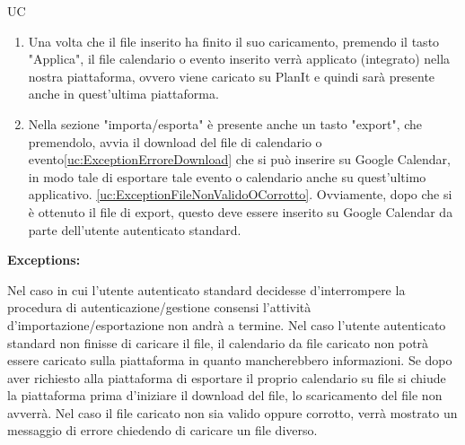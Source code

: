 \begin{listaPersonale}{UC}
\begin{listaPersonale2}[UC] {}
\begin{listaPersonale3}[UC]{}
\begin{enumerate}
                \item Una volta che il file inserito ha finito il suo caricamento, premendo il tasto "Applica", il file calendario o evento inserito verrà applicato (integrato) nella nostra piattaforma, ovvero viene caricato su PlanIt e quindi sarà presente anche in quest'ultima piattaforma.
                \item Nella sezione "importa/esporta" è presente anche un tasto "export", che premendolo, avvia il download del file di calendario o evento\ref{uc:ExceptionErroreDownload} che si può inserire su Google Calendar, in modo tale di esportare tale evento o calendario anche su quest'ultimo applicativo. \ref{uc:ExceptionFileNonValidoOCorrotto}. Ovviamente, dopo che si è ottenuto il file di export, questo deve essere inserito su Google Calendar da parte dell'utente autenticato standard.
            \end{enumerate}
        \end{listaPersonale3}

        \textbf{Exceptions:}
        \begin{enumerate}[label=\textbf{[exception \arabic{enumiii}]}, ref= \textbf{[exception \arabic{enumiii}]}]
             Nel caso in cui l'utente autenticato standard decidesse d'interrompere la procedura di autenticazione/gestione consensi l'attività d'importazione/esportazione non andrà a termine.
             Nel caso l'utente autenticato standard non finisse di caricare il file, il calendario da file caricato non potrà essere caricato sulla piattaforma in quanto mancherebbero informazioni.
             Se dopo aver richiesto alla piattaforma di esportare il proprio calendario su file si chiude la piattaforma prima d'iniziare il download del file, lo scaricamento del file non avverrà.
             Nel caso il file caricato non sia valido oppure corrotto, verrà mostrato un messaggio di errore chiedendo di caricare un file diverso.
        \end{enumerate}


    \end{listaPersonale2}


    \newpage


\end{listaPersonale}
